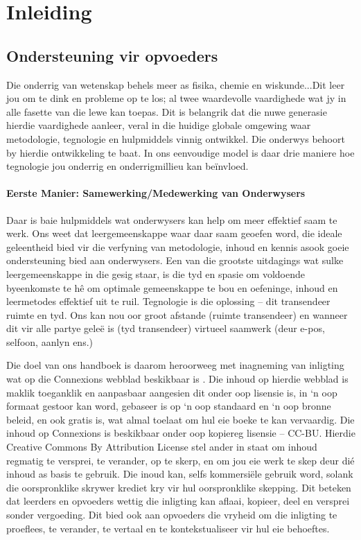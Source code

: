\chapter{Inleiding}

\section{Ondersteuning vir opvoeders}
Die onderrig van wetenskap behels meer as fisika, chemie en wiskunde...Dit leer jou om te dink en probleme op te los; al twee waardevolle vaardighede wat jy in alle fasette van die lewe kan toepas. Dit is belangrik dat die nuwe generasie hierdie vaardighede aanleer, veral in die huidige globale omgewing waar metodologie, tegnologie en hulpmiddels vinnig ontwikkel. Die onderwys behoort by hierdie ontwikkeling te baat. In ons eenvoudige model is daar drie maniere hoe tegnologie jou onderrig en onderrigmillieu kan beïnvloed.


\subsubsection{Eerste Manier: Samewerking/Medewerking van Onderwysers}
Daar is baie hulpmiddels wat onderwysers kan help om meer effektief saam te werk. Ons weet dat leergemeenskappe waar daar saam geoefen word, die ideale geleentheid bied vir die verfyning van metodologie, inhoud en kennis asook goeie ondersteuning bied aan onderwysers. Een van die grootste uitdagings wat sulke leergemeenskappe in die gesig staar, is die tyd en spasie om voldoende byeenkomste te hê om optimale gemeenskappe te bou en oefeninge, inhoud en leermetodes effektief uit te ruil. Tegnologie is die oplossing – dit transendeer ruimte en tyd. Ons kan nou oor groot afstande (ruimte transendeer) en wanneer dit vir alle partye geleë is (tyd transendeer) virtueel saamwerk (deur e-pos, selfoon, aanlyn ens.)\par


Die doel van ons handboek is daarom heroorweeg met inagneming van inligting wat op die Connexions webblad beskikbaar is . Die inhoud op hierdie webblad is maklik toeganklik en aanpasbaar aangesien dit onder oop lisensie is, in ‘n oop formaat gestoor kan word, gebaseer is op ‘n oop standaard en ‘n oop bronne beleid, en ook gratis is, wat almal toelaat om hul eie boeke te kan vervaardig. Die inhoud op Connexions is beskikbaar onder oop kopiereg lisensie – CC-BU. Hierdie Creative Commons By Attribution License stel ander in staat om inhoud regmatig te versprei, te verander, op te skerp, en om jou eie werk te skep deur dié inhoud as basis te gebruik. Die inoud kan, selfs kommersiële gebruik word, solank die oorspronklike skrywer krediet kry vir hul oorspronklike skepping. Dit beteken dat leerders en opvoeders wettig die inligting kan aflaai, kopieer, deel en versprei sonder vergoeding. Dit bied ook aan opvoeders die vryheid om die inligting te proeflees, te verander, te vertaal en te kontekstualiseer vir hul eie behoeftes.
 \par

